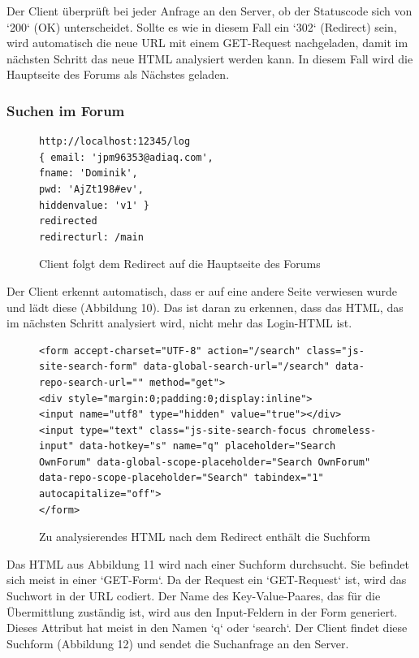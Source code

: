 Der Client überprüft bei jeder Anfrage an den Server, ob der Statuscode sich von `200` (OK) unterscheidet. Sollte es wie in diesem Fall ein `302` (Redirect) sein, wird automatisch die neue URL mit einem GET-Request nachgeladen, damit im nächsten Schritt das neue HTML analysiert werden kann. In diesem Fall wird die Hauptseite des Forums als Nächstes geladen.
\newpage

\subsubsection{Suchen im Forum}

\begin{figure}[ht]
\begin{lstlisting}[language=HTML5]
http://localhost:12345/log
{ email: 'jpm96353@adiaq.com',
fname: 'Dominik',
pwd: 'AjZt198#ev',
hiddenvalue: 'v1' }
redirected
redirecturl: /main
\end{lstlisting}
\caption{Client folgt dem Redirect auf die Hauptseite des Forums}
\end{figure}

Der Client erkennt automatisch, dass er auf eine andere Seite verwiesen wurde und lädt diese (Abbildung 10). Das ist daran zu erkennen, dass das HTML, das im nächsten Schritt analysiert wird, nicht mehr das Login-HTML ist.

\begin{figure}[h!]
\begin{lstlisting}[language=HTML5]
<form accept-charset="UTF-8" action="/search" class="js-site-search-form" data-global-search-url="/search" data-repo-search-url="" method="get">
<div style="margin:0;padding:0;display:inline">
<input name="utf8" type="hidden" value="true"></div>
<input type="text" class="js-site-search-focus chromeless-input" data-hotkey="s" name="q" placeholder="Search OwnForum" data-global-scope-placeholder="Search OwnForum" data-repo-scope-placeholder="Search" tabindex="1" autocapitalize="off">
</form>
\end{lstlisting}
\caption{Zu analysierendes HTML nach dem Redirect enthält die Suchform}
\end{figure}

Das HTML aus Abbildung 11 wird nach einer Suchform durchsucht. Sie befindet sich meist in einer `GET-Form`. Da der Request ein `GET-Request` ist, wird das Suchwort in der URL codiert. Der Name des Key-Value-Paares, das für die Übermittlung zuständig ist, wird aus den Input-Feldern in der Form generiert. Dieses Attribut hat meist in den Namen `q` oder `search`. Der Client findet diese Suchform (Abbildung 12) und sendet die Suchanfrage an den Server.


